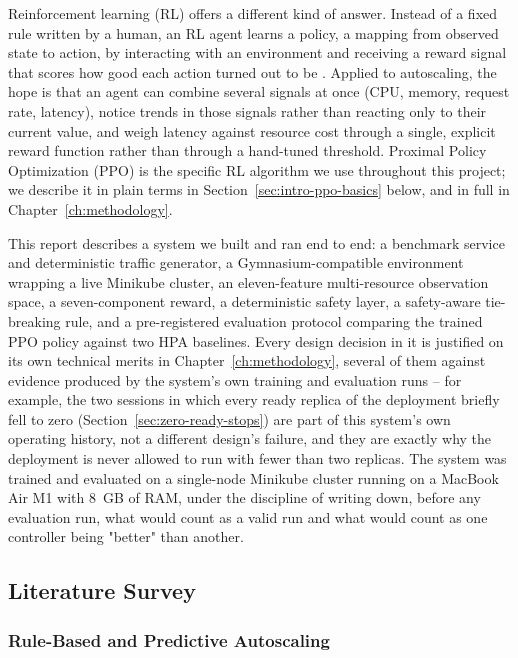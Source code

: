 Reinforcement learning (RL) offers a different kind of answer. Instead of a
fixed rule written by a human, an RL agent learns a policy, a mapping from
observed state to action, by interacting with an environment and receiving a
reward signal that scores how good each action turned out to be
\cite{sutton2018rl}. Applied to autoscaling, the hope is that an agent can
combine several signals at once (CPU, memory, request rate, latency),
notice trends in those signals rather than reacting only to their current
value, and weigh latency against resource cost through a single, explicit
reward function rather than through a hand-tuned threshold. Proximal Policy
Optimization (PPO) \cite{schulman2017ppo} is the specific RL algorithm we
use throughout this project; we describe it in plain terms in
Section~\ref{sec:intro-ppo-basics} below, and in full in
Chapter~\ref{ch:methodology}.

This report describes a system we built and ran end to end: a benchmark
service and deterministic traffic generator, a Gymnasium-compatible
environment wrapping a live Minikube cluster, an eleven-feature
multi-resource observation space, a seven-component reward, a deterministic
safety layer, a safety-aware tie-breaking rule, and a pre-registered
evaluation protocol comparing the trained PPO policy against two HPA
baselines. Every design decision in it is justified on its own technical
merits in Chapter~\ref{ch:methodology}, several of them against evidence
produced by the system's own training and evaluation runs -- for example,
the two sessions in which every ready replica of the deployment briefly fell
to zero (Section~\ref{sec:zero-ready-stops}) are part of this system's own
operating history, not a different design's failure, and they are exactly
why the deployment is never allowed to run with fewer than two replicas. The
system was trained and evaluated on a single-node Minikube cluster running
on a MacBook Air M1 with 8~GB of RAM, under the discipline of writing down,
before any evaluation run, what would count as a valid run and what would
count as one controller being "better" than another.

\subsection{Literature Survey}
\label{sec:related-work}

\subsubsection{Rule-Based and Predictive Autoscaling}

